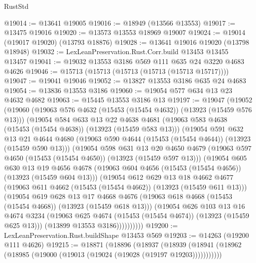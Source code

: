 \begin{lexlean}{RustStd}
\begin{coremodule}
@19014 := @13641 @19005
@19016 := @18949 (@13566 @13553)
@19017 := @13475 @19016
@19020 := @13573 @13553 @18969 @19007
@19024 := @19014 (@19017 @19020) (@13793 @18876)
@19028 := @13641 @19016 @19020 (@13798 @18948)
@19032 := LexLeanPreservation.Rust.Corr.build @13453 @13455 @13457
@19041 := @19032 @13553 @3186 @569 @111 @635 @24 @3220 @4683 @4626
@19046 := @15713 (@15713 (@15713 (@15713 (@15713 @15717))))
@19047 := @19041 @19046
@19052 := @13827 @13553 @3186 @635 @24 @4683
@19054 := @13836 @13553 @3186
@19060 := @19054 @577 @634 @13 @23 @4632 @4682
@19063 := @15445 @13553 @3186 @13
@19197 := @19047
    (@19052
      (@19060
        (@19063 @576 @4632 (@15453 (@15454 @4632)) (@13923 (@15459 @576 @13)))
        (@19054
          @584
          @633
          @13
          @22
          @4638
          @4681
          (@19063 @583 @4638 (@15453 (@15454 @4638)) (@13923 (@15459 @583 @13)))
          (@19054
            @591
            @632
            @13
            @21
            @4644
            @4680
            (@19063 @590 @4644 (@15453 (@15454 @4644)) (@13923 (@15459 @590 @13)))
            (@19054
              @598
              @631
              @13
              @20
              @4650
              @4679
              (@19063 @597 @4650 (@15453 (@15454 @4650)) (@13923 (@15459 @597 @13)))
              (@19054
                @605
                @630
                @13
                @19
                @4656
                @4678
                (@19063 @604 @4656 (@15453 (@15454 @4656)) (@13923 (@15459 @604 @13)))
                (@19054
                  @612
                  @629
                  @13
                  @18
                  @4662
                  @4677
                  (@19063 @611 @4662 (@15453 (@15454 @4662)) (@13923 (@15459 @611 @13)))
                  (@19054
                    @619
                    @628
                    @13
                    @17
                    @4668
                    @4676
                    (@19063 @618 @4668 (@15453 (@15454 @4668)) (@13923 (@15459 @618 @13)))
                    (@19054
                      @626
                      @103
                      @13
                      @16
                      @4674
                      @3234
                      (@19063 @625 @4674 (@15453 (@15454 @4674)) (@13923 (@15459 @625 @13)))
                      (@13899 @13553 @3186))))))))))
@19200 := LexLeanPreservation.Rust.buildShape @13453 @569
@19203 := @14263 (@19200 @111 @4626)
@19215 := @18871
    (@18896
      (@18937
        (@18939 (@18941 (@18962 (@18985 (@19000 (@19013 (@19024 (@19028 (@19197 @19203)))))))))))

\end{coremodule}
\end{lexlean}
